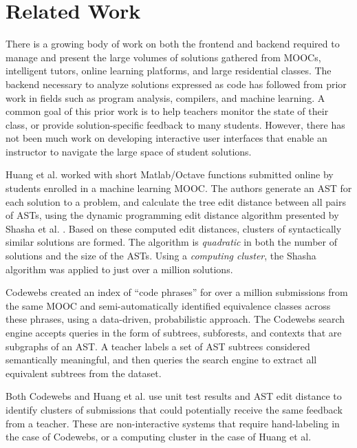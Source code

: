 \documentclass{sigchi}
\begin{document}
\section{Related Work}

There is a growing body of work on both the frontend and backend required to manage and present the large volumes of solutions gathered from MOOCs, intelligent tutors, online learning platforms, and large residential classes. The backend necessary to analyze solutions expressed as code has followed from prior work in fields such as program analysis, compilers, and machine learning. A common goal of this prior work is to help teachers monitor the state of their class, or provide solution-specific feedback to many students. However, there has not been much work on developing interactive user interfaces that enable an instructor to navigate the large space of student solutions.

Huang et al. \citeyear{MOOCshop} worked with short Matlab/Octave functions submitted online by students enrolled in a machine learning MOOC. The authors generate an AST for each solution to a problem, and calculate the tree edit distance between all pairs of ASTs, using the dynamic programming edit distance algorithm presented by Shasha et al. \citeyear{shasha1994exact}. Based on these computed edit distances, clusters of syntactically similar solutions are formed. The algorithm is \emph{quadratic} in both the number of solutions and the size of the ASTs. Using a \emph{computing cluster}, the Shasha algorithm was applied to just over a million solutions. 

Codewebs \cite{codewebs} created an index of ``code phrases'' for over a million submissions from the same MOOC and semi-automatically identified equivalence classes across these phrases, using a data-driven, probabilistic approach. The Codewebs search engine accepts queries in the form of subtrees, subforests, and contexts that are subgraphs of an AST. A teacher labels a set of AST subtrees considered semantically meaningful, and then queries the search engine to extract all equivalent subtrees from the dataset. 

Both Codewebs \cite{codewebs} and Huang et al. \citeyear{MOOCshop} use unit test results and AST edit distance to identify clusters of submissions that could potentially receive the same feedback from a teacher. These are non-interactive systems that require hand-labeling in the case of Codewebs, or a computing cluster in the case of Huang et al. 
\end{document}
